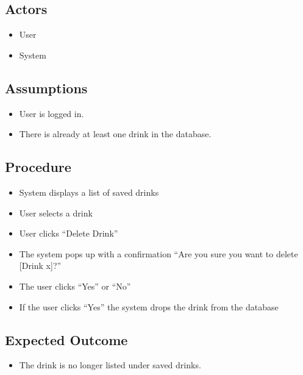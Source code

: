 {        \subsection{Actors}
            \begin{itemize}
                \item User
                \item System
            \end{itemize}
        \subsection{Assumptions}
            \begin{itemize}
                \item User is logged in.
                \item There is already at least one drink in the database.
            \end{itemize}
        \subsection{Procedure}
            \begin{itemize}
                \item System displays a list of saved drinks
                \item User selects a drink
                \item User clicks ``Delete Drink''
                \item The system pops up with a confirmation ``Are you sure you
                want to delete [Drink x]?''
                \item The user clicks ``Yes'' or ``No''
                \item If the user clicks ``Yes'' the system drops the drink 
                from the database
            \end{itemize}
        \subsection{Expected Outcome}
            \begin{itemize}
                \item The drink is no longer listed under saved drinks.
            \end{itemize}

            
}
